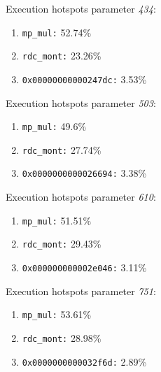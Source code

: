 Execution hotspots parameter \textit{434}:
\begin{enumerate}[noitemsep]
	\item \texttt{mp\_mul:} 52.74\%
	\item \texttt{rdc\_mont:} 23.26\%
	\item \texttt{0x00000000000247dc:} 3.53\%
\end{enumerate}
Execution hotspots parameter \textit{503}:
\begin{enumerate}[noitemsep]
	\item \texttt{mp\_mul:} 49.6\%
	\item \texttt{rdc\_mont:} 27.74\%
	\item \texttt{0x0000000000026694:} 3.38\%
\end{enumerate}
Execution hotspots parameter \textit{610}:
\begin{enumerate}[noitemsep]
	\item \texttt{mp\_mul:} 51.51\%
	\item \texttt{rdc\_mont:} 29.43\%
	\item \texttt{0x000000000002e046:} 3.11\%
\end{enumerate}
Execution hotspots parameter \textit{751}:
\begin{enumerate}[noitemsep]
	\item \texttt{mp\_mul:} 53.61\%
	\item \texttt{rdc\_mont:} 28.98\%
	\item \texttt{0x0000000000032f6d:} 2.89\%
\end{enumerate}